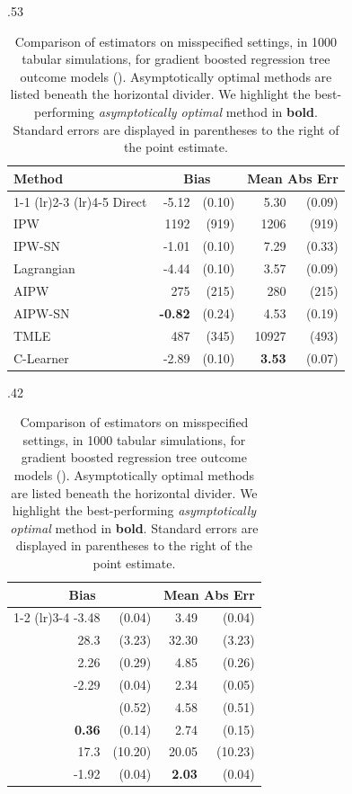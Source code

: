 \begin{table}[t]
\footnotesize
\centering
\hfill
\begin{subtable}{.53\linewidth}
\centering
\caption{$N=200$} %
\begin{tabular}{lrrrr}
\toprule
Method & \multicolumn{2}{c}{Bias} & \multicolumn{2}{c}{Mean Abs Err} \\
\cmidrule(lr){1-1}
\cmidrule(lr){2-3}
\cmidrule(lr){4-5}
Direct & -5.12 & (0.10) & 5.30 & (0.09)\\
IPW & 1192 & (919) & 1206 & (919) \\
IPW-SN & -1.01 & (0.10) & 7.29 & (0.33)\\
Lagrangian & -4.44 & (0.10) & 3.57 & (0.09) \\
\greymidrule
AIPW & 275 & (215) & 280 & (215) \\
AIPW-SN & \textbf{-0.82} & (0.24) & 4.53 & (0.19) \\
TMLE & 487 & (345) & 10927 & (493) \\
C-Learner & -2.89 & (0.10) & \textbf{3.53} & (0.07) \\
\bottomrule
\end{tabular}
\end{subtable}
\hspace{-3.15em}
\begin{subtable}{.42\linewidth}
\centering
\caption{$N=1000$} %
\begin{tabular}{rrrr}
\toprule
 \multicolumn{2}{c}{Bias} & \multicolumn{2}{c}{Mean Abs Err} \\
\cmidrule(lr){1-2}
\cmidrule(lr){3-4}
-3.48 & (0.04) & 3.49 & (0.04)\\
28.3 & (3.23) & 32.30 & (3.23) \\
2.26 & (0.29) & 4.85 & (0.26)\\
-2.29 & (0.04) & 2.34 & (0.05) \\
\greymidrule
2.28 & (0.52) & 4.58 & (0.51) \\
\textbf{0.36} & (0.14) & 2.74 & (0.15) \\
17.3 & (10.20) & 20.05 & (10.23) \\
-1.92 & (0.04) & \textbf{2.03} & (0.04) \\
\bottomrule
\end{tabular}
\end{subtable}
\hfill
\hspace*{\fill}
\caption{ Comparison of estimators on misspecified \citet{KangSc07} settings, in 1000 tabular simulations, for gradient boosted regression tree outcome models (). Asymptotically optimal methods are listed beneath the horizontal divider. We highlight the best-performing \emph{asymptotically optimal} method in \textbf{bold}. %
Standard errors are displayed in parentheses to the right of the point estimate.
}

    \label{tb:linear_simulation_xgb}
\end{table}

